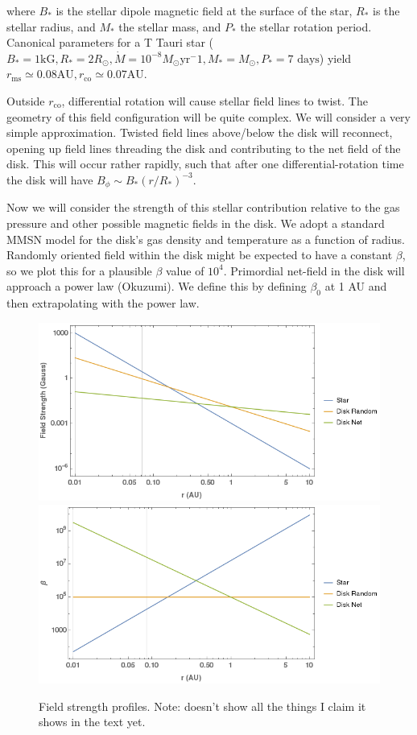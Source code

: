 \noindent where $B_*$ is the stellar dipole magnetic field at the surface of the star, $R_*$ is the stellar radius, and $M_*$ the stellar mass, and $P_*$ the stellar rotation period.  Canonical parameters for a T Tauri star ($B_*=1\text{kG}, R_*=2R_\odot, \dot{M}=10^{-8}M_\odot \text{yr}^-1, M_*=M_\odot, P_*=7 \text{ days}$) yield $r_\text{ms} \simeq 0.08 \text{AU}, r_\text{co} \simeq 0.07 \text{AU}$.

Outside $r_{\text{co}}$, differential rotation will cause stellar field lines to twist.  The geometry of this field configuration will be quite complex.  We will consider a very simple approximation.  Twisted field lines above/below the disk will reconnect, opening up field lines threading the disk and contributing to the net field of the disk.  This will occur rather rapidly, such that after one differential-rotation time the disk will have $B_\phi \sim B_* (r/R_*)^{-3}$. 

Now we will consider the strength of this stellar contribution relative to the gas pressure and other possible magnetic fields in the disk.  We adopt a standard MMSN model for the disk's gas density and temperature as a function of radius.  Randomly oriented field within the disk might be expected to have a constant $\beta$, so we plot this for a plausible $\beta$ value of $10^4$.  Primordial net-field in the disk will approach a power law (Okuzumi).  We define this by defining $\beta_0$ at 1 AU and then extrapolating with the power law.

\begin{figure}[p]
\centering
\includegraphics[width=0.8\columnwidth]{figs/figsChapter3/FieldStrengthProfiles.png}
\includegraphics[width=0.8\columnwidth]{figs/figsChapter3/BetaProfiles.png}
\caption{Field strength profiles. Note: doesn't show all the things I claim it shows in the text yet.}
\label{fieldStrengthProfiles}
\end{figure}

